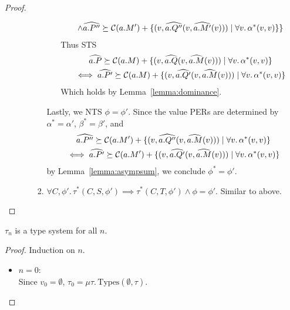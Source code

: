 \begin{proof}
\begin{enumerate}
\begin{itemize}
\begin{enumerate}
\begin{itemize}
\begin{gather*}
        \land\widehat{a.P''} \succeq \mathcal{C}(a.M') + \{(v, \widehat{a.Q''}(v,\widehat{a.M'}(v))) \mid \forall v.\, \alpha^*(v,v)\}\} 
      \end{gather*}
          Thus STS
          \begin{gather*}
            \widehat{a.P} \succeq \mathcal{C}(a.M) + \{(v, \widehat{a.Q}(v,\widehat{a.M}(v))) \mid \forall v.\, \alpha^*(v,v)\}\\
          \iff \widehat{a.P'} \succeq \mathcal{C}(a.M) + \{(v, \widehat{a.Q'}(v,\widehat{a.M}(v))) \mid \forall v.\, \alpha^*(v,v)\} 
          \end{gather*}
          Which holds by Lemma~\ref{lemma:dominance}.
      \end{itemize}
      Lastly, we NTS $\phi = \phi'$. Since the value PERs are determined by $\alpha^* = \alpha'$, $\beta^* = \beta'$, 
      and 
          \begin{gather*}
            \widehat{a.P''} \succeq \mathcal{C}(a.M') + \{(v, \widehat{a.Q''}(v,\widehat{a.M}(v))) \mid \forall v.\, \alpha^*(v,v)\}\\
          \iff \widehat{a.P'} \succeq \mathcal{C}(a.M') + \{(v, \widehat{a.Q'}(v,\widehat{a.M}(v))) \mid \forall v.\, \alpha^*(v,v)\} 
          \end{gather*}
          by Lemma~\ref{lemma:asympsum},
      we conclude $\phi^* = \phi'$.
  \item $\forall C,\phi'.\, \tau^*(C,S,\phi') \implies \tau^*(C,T,\phi') \land \phi = \phi'$. Similar to above.
  \end{enumerate}

\end{itemize}
\end{enumerate}
\end{proof}


\begin{lemma}
$\tau_n$ is a type system for all $n$.
\end{lemma}

\begin{proof}
Induction on $n$.
\begin{itemize}
\item $n = 0$:\\
Since $v_0 = \emptyset$, $\tau_0 = \mu \tau.\, \text{Types}(\emptyset, \tau)$. 
\end{itemize}
\end{proof}
